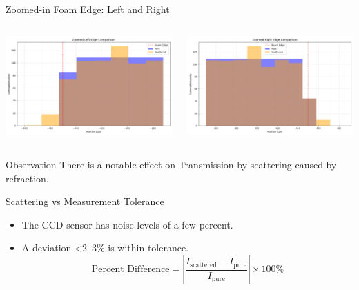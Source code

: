 \documentclass[aspectratio=169,xcolor=dvipsnames]{beamer}
\begin{document}
\begin{frame}{Zoomed-in Foam Edge: Left and Right}
  \begin{columns}
    \centering
    \includegraphics[width=\linewidth]{zoomed_left_edge_new.png}
    
    \centering
    \includegraphics[width=\linewidth]{zoomed_right_edge_new.png}
  \end{columns}
  \vspace{0.3cm}
  \begin{block}{Observation}
    There is a notable effect on Transmission by scattering caused by refraction.
  \end{block}
\end{frame}


\begin{frame}{Scattering vs Measurement Tolerance}
  \begin{itemize}
    \item The CCD sensor has noise levels of a few percent.
    \item A deviation \textless 2–3\% is within tolerance.
\[
\text{Percent Difference} = \left| \frac{I_{\text{scattered}} - I_{\text{pure}}}{I_{\text{pure}}} \right| \times 100\%\]

  \end{itemize}
\end{frame}
\end{document}
